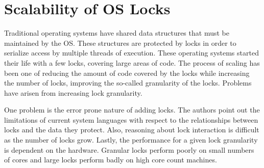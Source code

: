 \documentclass[12pt]{article}
\begin{document}
\section*{Scalability of OS Locks}
Traditional operating systems have shared data structures that must be
maintained by the OS.  These structures are protected by locks in
order to serialize access by multiple threads of execution.  These
operating systems started their life with a few locks, covering large
areas of code.  The process of scaling has been one of reducing the
amount of code covered by the locks while increasing the number of
locks, improving the so-called granularity of the locks.  Problems
have arisen from increasing lock granularity.

One problem is the error prone nature of adding locks.  The authors
point out the limitations of current system languages with respect to
the relationships between locks and the data they protect.  Also,
reasoning about lock interaction is difficult as the number of locks
grow.  Lastly, the performance for a given lock granularity is
dependent on the hardware.  Granular locks perform poorly on small
numbers of cores and large locks perform badly on high core count
machines.




\end{document}
